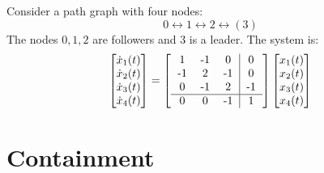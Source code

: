 \begin{description}
        \begin{example}
            Consider a path graph with four nodes:
            \[ 0 \leftrightarrow 1 \leftrightarrow 2 \leftrightarrow (3) \]
            The nodes $0, 1, 2$ are followers and $3$ is a leader. The system is:
            \[
                \begin{bmatrix}
                    \dot{x}_1(t) \\ \dot{x}_2(t) \\ \dot{x}_3(t) \\ \dot{x}_4(t)
                \end{bmatrix} = 
                \begin{bmatrix}
                    \begin{tabular}{ccc|c}
                        1   & -1    & 0     & 0     \\
                        -1  & 2     & -1    & 0     \\
                        0   & -1    & 2    & -1    \\
                        \hline
                        0   & 0     & -1    & 1     \\
                    \end{tabular}
                \end{bmatrix}
                \begin{bmatrix}
                    x_1(t) \\ x_2(t) \\ x_3(t) \\ x_4(t)
                \end{bmatrix}
            \]
    \end{example}

\end{description}



\section{Containment}

